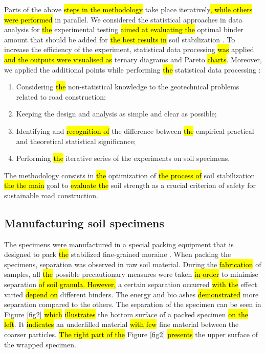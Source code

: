 \documentclass[constrmater,article,submit,pdftex,moreauthors]{Definitions/mdpi}
\begin{document}
Parts of the above \hl{steps in the methodology} take place iteratively\hl{, while others were performed }in parallel. We considered the statistical approaches in data analysis for \hl{the }experimental testing \hl{aimed at evaluating the }optimal binder amount that should be added for \hl{the best results in }soil stabilization \citep{Box}. To increase the efficiency of the experiment, statistical data processing \hl{was} applied \hl{and the outputs were visualised as }ternary diagrams and Pareto \hl{charts}. Moreover, we applied the additional points while performing \hl{the }statistical data processing \cite{Montgomery1997}: 

\begin{enumerate}
	\item	Considering \hl{the }non-statistical knowledge to the geotechnical problems related to road construction; 
	\item Keeping the design and analysis as simple and clear as possible; 
	\item Identifying and \hl{recognition of} the difference between \hl{the }empirical practical and theoretical statistical significance; 
	\item Performing \hl{the }iterative series of the experiments on soil specimens. 
\end{enumerate}	

	The methodology consists in \hl{the }optimization of \hl{the process of }soil stabilization \hl{the the main }goal\hl{ }to \hl{evaluate the }soil strength as a crucial criterion of safety for sustainable road construction. 

\subsection{Manufacturing soil specimens}
	The specimens were manufactured in a special packing equipment that is designed to pack \hl{the} stabilized fine-grained moraine \cite{Lindh2004}. When packing the specimens, separation was observed in raw soil material. During the \hl{fabrication} of\hl{ }samples, all \hl{the} possible precautionary measures were taken \hl{in order} to minimise separation\hl{ of soil granula. However, }a certain separation occurred \hl{with the} effect varied \hl{depend on} different binders. The energy and bio ashes \hl{demonstrated} more separation compared to the others. The separation of the specimen can be seen in Figure \ref{fig2} \hl{which} \hl{illustrates} the bottom surface of a packed specimen \hl{on the left}. It \hl{indicates} an underfilled material \hl{with few} fine material between the coarser particles. \hl{The right part of the }Figure \ref{fig2} \hl{presents} the upper surface of the wrapped specimen. 
	
\end{document}

